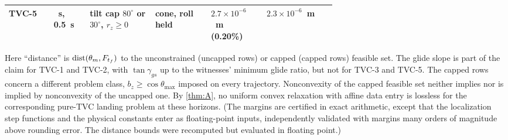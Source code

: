\begin{theorem}
\begin{center}
\begin{tabular}{@{}l>{\raggedright\arraybackslash}p{0.11\linewidth}>{\raggedright\arraybackslash}p{0.2\linewidth}>{\raggedright\arraybackslash}p{0.17\linewidth}>{\raggedright\arraybackslash}p{0.17\linewidth}l@{}}
TVC-5 & 5~s, 0.5~s & tilt cap $80^\circ$ or $30^\circ$, $r_z\ge0$ & cone, roll held & $2.7\times10^{-6}$~m (0.20\%) & $2.3\times10^{-6}$~m\\\bottomrule
\end{tabular}
\end{center}
Here ``distance'' is $\operatorname{dist}(\theta_m,F_{t_f})$ to the unconstrained (uncapped rows) or capped (capped rows) feasible set. The glide
slope is part of the claim for TVC-1 and TVC-2, with $\tan\gamma_{gs}$ up to the witnesses' minimum glide ratio, but not for
TVC-3 and TVC-5. The capped rows concern a different problem class, $b_z\ge\cos\theta_{\max}$ imposed on every trajectory.
Nonconvexity of the capped feasible set neither implies nor is implied by nonconvexity of the uncapped one. By \cref{thm:A}, no
uniform convex relaxation with affine data entry is lossless for the corresponding pure-TVC landing problem at these horizons.
 (The margins are certified in exact arithmetic, except that the localization step functions and the physical constants enter
as floating-point inputs, independently validated with margins many orders of magnitude above rounding error. The distance
bounds were recomputed  but evaluated in floating point.)
\end{theorem}

